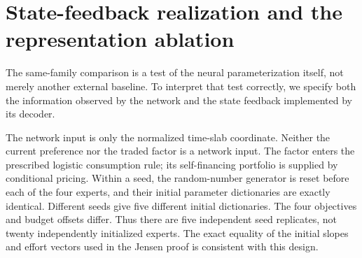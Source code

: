\section{State-feedback realization and the representation ablation}\label{sec:r21snapshot}
The same-family comparison is a test of the neural parameterization itself, not merely another external baseline. To interpret that test correctly, we specify both the information observed by the network and the state feedback implemented by its decoder.

The network input is only the normalized time-slab coordinate. Neither the current preference nor the traded factor is a network input. The factor enters the prescribed logistic consumption rule; its self-financing portfolio is supplied by conditional pricing. Within a seed, the random-number generator is reset before each of the four experts, and their initial parameter dictionaries are exactly identical. Different seeds give five different initial dictionaries. The four objectives and budget offsets differ. Thus there are five independent seed replicates, not twenty independently initialized experts. The exact equality of the initial slopes and effort vectors used in the Jensen proof is consistent with this design.

